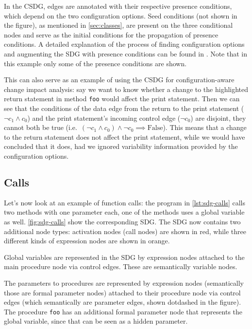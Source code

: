 In the CSDG, edges are annotated with their respective presence conditions, which depend on the two configuration 
options. Seed conditions (not shown in the figure), as mentioned in \autoref{sec:classes}, are present on the three 
conditional nodes and serve as the initial conditions for the propagation of presence conditions. A detailed 
explanation of the process of finding configuration options and augmenting the SDG with presence conditions can be 
found in \cite{DBLP:conf/kbse/AngererGPG15}. Note that in this example only some of the presence conditions are shown.

This can also serve as an example of using the CSDG for configuration-aware change impact analysis: say we want to know 
whether a change to the highlighted return statement in method \lstinline|foo| would affect the print statement. Then 
we can see that the conditions of the data edge from the return to the print statement ($ \lnot c_1 \land c_0 $) and 
the print statement's incoming control edge ($ \lnot c_0 $) are disjoint, they cannot both be true
(i.e.\ $ \left( \lnot c_1 \land c_0 \right) \land \lnot c_0 \implies \text{False} $). This means that a change to the 
return statement does not affect the print statement, while we would have concluded that it does, had we ignored 
variability information provided by the configuration options.



\subsection{Calls}

Let's now look at an example of function calls: the program in \autoref{lst:sdg-calls} calls two methods with one 
parameter each, one of the methods uses a global variable as well. \autoref{fig:sdg-calls} show the corresponding SDG. 
The SDG now contains two additional node types: activation nodes (call nodes) are shown in red, while three different 
kinds of expression nodes are shown in orange.

Global variables are represented in the SDG by expression nodes attached to the main procedure node via control edges. 
These are semantically variable nodes.

The parameters to procedures are represented by expression nodes (semantically those are formal parameter nodes) 
attached to their procedure node via control edges (which semantically are parameter edges, shown dotdashed in the 
figure). The procedure \lstinline|foo| has an additional formal parameter node that represents the global variable, 
since that can be seen as a hidden parameter.

